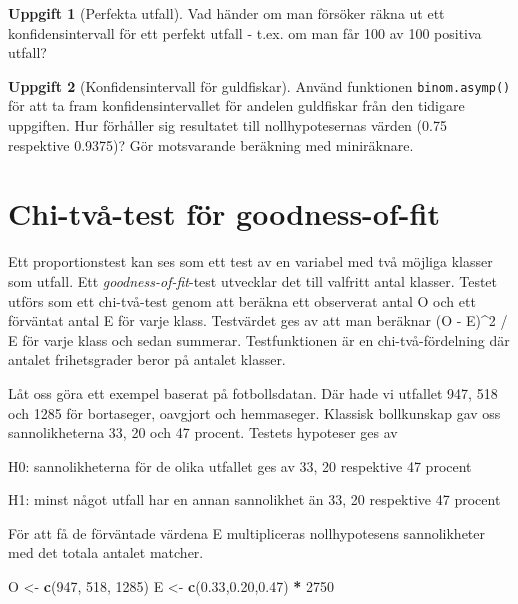 \documentclass[
]{book}
\newenvironment{Shaded}{\begin{snugshade}}{\end{snugshade}}
\newcommand{\DecValTok}[1]{\textcolor[rgb]{0.00,0.00,0.81}{#1}}
\newcommand{\FloatTok}[1]{\textcolor[rgb]{0.00,0.00,0.81}{#1}}
\newcommand{\FunctionTok}[1]{\textcolor[rgb]{0.13,0.29,0.53}{\textbf{#1}}}
\newcommand{\NormalTok}[1]{#1}
\newcommand{\OtherTok}[1]{\textcolor[rgb]{0.56,0.35,0.01}{#1}}
\newcommand{\SpecialCharTok}[1]{\textcolor[rgb]{0.81,0.36,0.00}{\textbf{#1}}}
\theoremstyle{definition}
\theoremstyle{definition}
\theoremstyle{definition}
\newtheorem{exercise}{Uppgift}[chapter]
\theoremstyle{definition}
\theoremstyle{remark}
\begin{document}
\begin{exercise}[Perfekta utfall]
Vad händer om man försöker räkna ut ett konfidensintervall för ett perfekt utfall - t.ex. om man får 100 av 100 positiva utfall?
\end{exercise}

\begin{exercise}[Konfidensintervall för guldfiskar]
Använd funktionen \texttt{binom.asymp()} för att ta fram konfidensintervallet för andelen guldfiskar från den tidigare uppgiften. Hur förhåller sig resultatet till nollhypotesernas värden (0.75 respektive 0.9375)? Gör motsvarande beräkning med miniräknare.
\end{exercise}

\hypertarget{chi-tvuxe5-test-fuxf6r-goodness-of-fit}{%
\section{Chi-två-test för goodness-of-fit}\label{chi-tvuxe5-test-fuxf6r-goodness-of-fit}}

Ett proportionstest kan ses som ett test av en variabel med två möjliga klasser som utfall. Ett \emph{goodness-of-fit}-test utvecklar det till valfritt antal klasser. Testet utförs som ett chi-två-test genom att beräkna ett observerat antal O och ett förväntat antal E för varje klass. Testvärdet ges av att man beräknar (O - E)\^{}2 / E för varje klass och sedan summerar. Testfunktionen är en chi-två-fördelning där antalet frihetsgrader beror på antalet klasser.

Låt oss göra ett exempel baserat på fotbollsdatan. Där hade vi utfallet 947, 518 och 1285 för bortaseger, oavgjort och hemmaseger. Klassisk bollkunskap gav oss sannolikheterna 33, 20 och 47 procent. Testets hypoteser ges av

H0: sannolikheterna för de olika utfallet ges av 33, 20 respektive 47 procent

H1: minst något utfall har en annan sannolikhet än 33, 20 respektive 47 procent

För att få de förväntade värdena E multipliceras nollhypotesens sannolikheter med det totala antalet matcher.

\begin{Shaded}
\begin{Highlighting}[]
\NormalTok{O }\OtherTok{\textless{}{-}} \FunctionTok{c}\NormalTok{(}\DecValTok{947}\NormalTok{, }\DecValTok{518}\NormalTok{, }\DecValTok{1285}\NormalTok{)}
\NormalTok{E }\OtherTok{\textless{}{-}} \FunctionTok{c}\NormalTok{(}\FloatTok{0.33}\NormalTok{,}\FloatTok{0.20}\NormalTok{,}\FloatTok{0.47}\NormalTok{) }\SpecialCharTok{*} \DecValTok{2750}
\end{Highlighting}
\end{Shaded}
\end{document}
